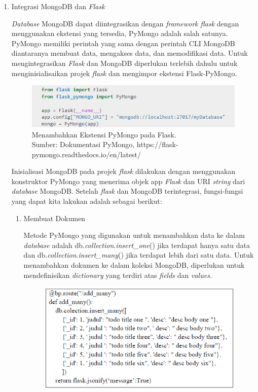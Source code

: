 \begin{enumerate}
	\item Integrasi MongoDB dan \emph{Flask}
	
	\emph{Database} MongoDB dapat diintegrasikan dengan \emph{framework flask} dengan menggunakan ekstensi yang tersedia, PyMongo adalah salah satunya. PyMongo memiliki perintah yang sama dengan perintah CLI MongoDB diantaranya membuat data, mengakses data, dan memodifikasi data. Untuk mengintegrasikan \emph{Flask} dan MongoDB diperlukan terlebih dahulu untuk menginisialisaikan projek \emph{flask} dan mengimpor ekstensi Flask-PyMongo.
	
	\begin{figure}[H]
		\centering
		\includegraphics[width=12cm]{gambar/mongoDB3.png}
		\caption{Menambahkan Ekstensi PyMongo pada Flask. \\ Sumber: Dokumentasi PyMongo, https://flask-pymongo.readthedocs.io/en/latest/}
		\label{Gambar:registrasi blueprint}
	\end{figure}

	Inisialisasi MongoDB pada projek \emph{flask} dilakukan dengan menggunakan konstruktor PyMongo yang menerima objek app \emph{Flask} dan URI \emph{string} dari \emph{database} MongoDB. Setelah \emph{flask} dan MongoDB terintegrasi, fungsi-fungsi yang dapat kita lakukan adalah sebagai berikut:
	
	\begin{enumerate}
		\item Membuat Dokumen
		
		Metode PyMongo yang digunakan untuk menambahkan data ke dalam \emph{database} adalah db.\emph{collection}.\emph{insert\_one}() jika terdapat hanya satu data dan db.\emph{collection}.\emph{insert\_many}() jika terdapat lebih dari satu data. Untuk menambahkan dokumen ke dalam koleksi MongoDB, diperlukan untuk mendefinisikan \emph{dictionary} yang terdiri atas \emph{fields} dan \emph{values}.
		
			\begin{figure}[H]
				\centering
				\includegraphics[width=12cm]{gambar/mongoDB4.png}
			\end{figure}
		

\end{enumerate}
\end{enumerate}
